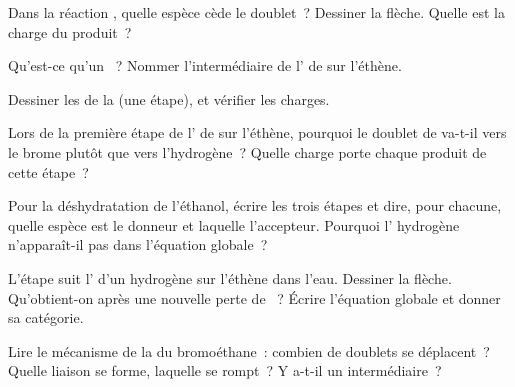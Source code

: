 \begin{exercise}[$\star$]\label{exo:g12:curly-arrows:4}
Dans la réaction , quelle espèce cède le doublet~?
Dessiner la flèche. Quelle est la charge du produit~?
\end{exercise}

\begin{exercise}[$\star$]\label{exo:g12:curly-arrows:5}
Qu'est-ce qu'un ~? Nommer l'intermédiaire de
l' de
 sur l'éthène.
\end{exercise}

\begin{exercise}[$\star\star$]\label{exo:g12:curly-arrows:6}
Dessiner les  de la 
 (une étape), et vérifier les charges.
\end{exercise}

\begin{exercise}[$\star\star$]\label{exo:g12:curly-arrows:7}
Lors de la première étape de l' de  sur l'éthène,
pourquoi le doublet de
 va-t-il vers le brome plutôt que vers l'hydrogène~? Quelle
charge porte chaque produit de cette étape~?
\end{exercise}

\begin{exercise}[$\star\star$]\label{exo:g12:curly-arrows:8}
Pour la déshydratation de l'éthanol, écrire les trois étapes et dire,
pour chacune, quelle espèce est le donneur et laquelle l'accepteur.
Pourquoi l' hydrogène n'apparaît-il pas dans l'équation globale~?
\end{exercise}

\begin{exercise}[$\star\star$]\label{exo:g12:curly-arrows:9}
L'étape  suit
l' d'un  hydrogène sur l'éthène dans l'eau. Dessiner la
flèche. Qu'obtient-on après une nouvelle perte de ~? Écrire
l'équation globale et donner sa catégorie.
\end{exercise}

\begin{exercise}[$\star\star$]\label{exo:g12:curly-arrows:10}
Lire le mécanisme de la  du bromoéthane~: combien de
doublets se déplacent~? Quelle liaison se forme, laquelle se rompt~?
Y a-t-il un intermédiaire~?
\end{exercise}

